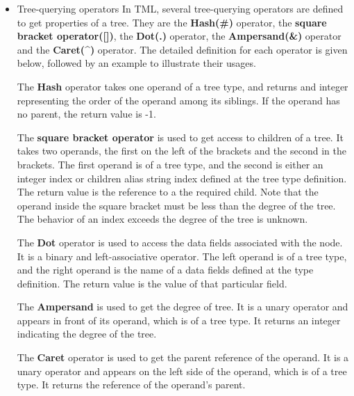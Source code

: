 \documentclass[12pt,psfig,a4]{article}
\begin{document}
\begin{itemize}
\item Tree-querying operators
\label{treeOp}
In TML, several tree-querying operators are defined to get properties of a tree. They are the \textbf{Hash(\#)} operator, the \textbf{square bracket operator([])}, the \textbf{Dot(.)} operator, the \textbf{Ampersand(\&)} operator and the \textbf{Caret(\^{})} operator. The detailed definition for each operator is given below, followed by an example to illustrate their usages.

The \textbf{Hash} operator takes one operand of a tree type, and returns and integer representing the order of the operand among its siblings. If the operand has no parent, the return value is -1. 

The \textbf{square bracket operator} is used to get access to children of a tree. It takes two operands, the first on the left of the brackets and the second in the brackets. The first operand is of a tree type, and the second is either an integer index or children alias string index defined at the tree type definition. The return value is the reference to a the required child. Note that the operand inside the square bracket must be less than the degree of the tree. The behavior of an index exceeds the degree of the tree is unknown.

The \textbf{Dot} operator is used to access the data fields associated with the node. It is a binary and left-associative operator. The left operand is of a tree type, and the right operand is the name of a data fields defined at the type definition. The return value is the value of that particular field.

The \textbf{Ampersand} is used to get the degree of tree. It is a unary operator and appears in front of its operand, which is of a tree type. It returns an integer indicating the degree of the tree.

The \textbf{Caret} operator is used to get the parent reference of the operand. It is a unary operator and appears on the left side of the operand, which is of a tree type. It returns the reference of the operand's parent.



\end{itemize}
\end{document}
